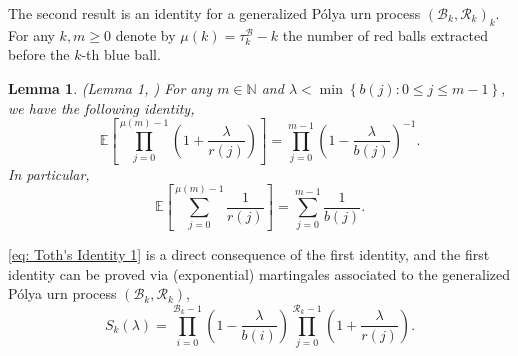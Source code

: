 \documentclass[twoside,12pt, a4paper, final]{article}
\newtheorem{lemma}{Lemma}[section]
\numberwithin{equation}{section}
\theoremstyle{remark}
\begin{document}
	
	
	The second result is an identity for a generalized P\'{o}lya urn process $(\mathcal{B}_{k},\mathcal{R}_{k})_k$. For any $k,m\geq 0$ denote by $\mu(k)= \tau^{\mathcal{B}}_k - k$ the number of red balls extracted before the $k$-th blue ball. 
	\begin{lemma}(Lemma 1, \cite{T96}) \label{lm: Toth's Identity}
		For any $m\in \mathbb{N}$ and $\lambda < \min\left\{ b(j): 0\leq j\leq m-1 \right\}$, we have the following identity,
		$$  \mathbb{E}\left[  \prod_{j=0}^{ \mu(m)-1 } \left(1+ \frac{\lambda}{r(j)}   \right) \right] =   \prod_{j=0}^{ m-1 } \left(1- \frac{\lambda}{b(j)}   \right)^{-1}.   $$ 
		In particular, 
		\begin{equation}\label{eq: Toth's Identity 1}
			\mathbb{E}\left[  \sum_{j=0}^{ \mu(m)-1 } \frac{1}{r(j)}   \right] =   \sum_{j=0}^{ m-1 } \frac{1}{b(j)}.
		\end{equation}	
	\end{lemma}
	\eqref{eq: Toth's Identity 1} is a direct consequence of the first identity, and the first identity can be proved via (exponential) martingales associated to the generalized P\'{o}lya urn process $(\mathcal{B}_{k},\mathcal{R}_{k})$, 
	\[
	S_k(\lambda) = \prod_{i=0}^{ \mathcal{B}_{k}-1 } \left(1-\frac{\lambda}{b(i)}\right) \prod_{j=0}^{\mathcal{R}_{k}-1 } \left(1+\frac{\lambda}{r(j)}\right)
	.\]
	
\end{document}
